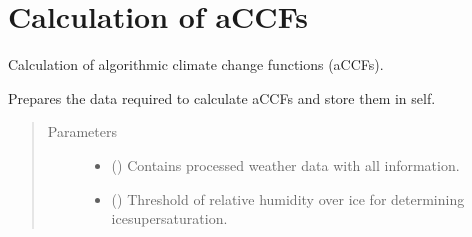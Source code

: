 \documentclass[a4paper,11pt,english]{sphinxmanual}
\begin{document}
\label{\detokenize{modules:module-envlib.weather_store}}

\section{Calculation of aCCFs}
\label{\detokenize{modules:calculation-of-accfs}}

\begin{fulllineitems}
\label{\detokenize{modules:envlib.accf.GeTaCCFs}}
Calculation of algorithmic climate change functions (aCCFs).

\begin{fulllineitems}
\label{\detokenize{modules:envlib.accf.GeTaCCFs.__init__}}
Prepares the data required to calculate aCCFs and store them in self.
\begin{quote}\begin{description}
\item[{Parameters}] \leavevmode\begin{itemize}
\item {} 
 () \textendash{} Contains processed weather data with all information.

\item {} 
 () \textendash{} Threshold of relative humidity over ice for determining ice\sphinxhyphen{}supersaturation.

\end{itemize}

\end{description}\end{quote}

\end{fulllineitems}


\end{fulllineitems}
\end{document}
